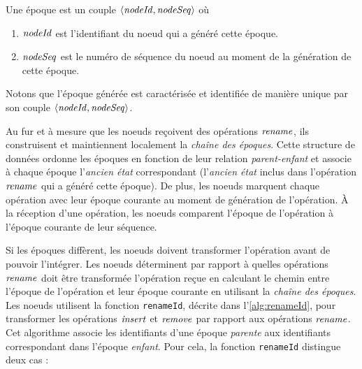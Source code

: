 \begin{definition}[Époque]
  Une époque est un couple $\langle \mathit{nodeId}, \mathit{nodeSeq} \rangle$ où
  \begin{enumerate}
    \item $\mathit{nodeId}$ est l'identifiant du noeud qui a généré cette époque.
    \item $\mathit{nodeSeq}$ est le numéro de séquence du noeud au moment de la génération de cette époque.
  \end{enumerate}
\end{definition}

Notons que l'époque générée est caractérisée et identifiée de manière unique par son couple $\langle \mathit{nodeId}, \mathit{nodeSeq} \rangle$.

Au fur et à mesure que les noeuds reçoivent des opérations $\mathit{rename}$, ils construisent et maintiennent localement la \emph{chaîne des époques}.
Cette structure de données ordonne les époques en fonction de leur relation \emph{parent-enfant} et associe à chaque époque l'\emph{ancien état} correspondant (\ie l'\emph{ancien état} inclus dans l'opération $\mathit{rename}$ qui a généré cette époque).
De plus, les noeuds marquent chaque opération avec leur époque courante au moment de génération de l'opération.
À la réception d'une opération, les noeuds comparent l'époque de l'opération à l'époque courante de leur séquence.

Si les époques diffèrent, les noeuds doivent transformer l'opération avant de pouvoir l'intégrer.
Les noeuds déterminent par rapport à quelles opérations $\mathit{rename}$ doit être transformée l'opération reçue en calculant le chemin entre l'époque de l'opération et leur époque courante en utilisant la \emph{chaîne des époques}.\\

Les noeuds utilisent la fonction \texttt{renameId}, décrite dans l'\autoref{alg:renameId}\footnotemark, pour transformer les opérations $\mathit{insert}$ et $\mathit{remove}$ par rapport aux opérations $\mathit{rename}$.
Cet algorithme associe les identifiants d'une époque \emph{parente} aux identifiants correspondant dans l'époque \emph{enfant}.
Pour cela, la fonction \texttt{renameId} distingue deux cas :

